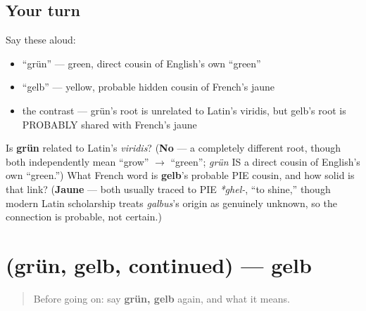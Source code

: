 \subsection*{Your turn}
Say these aloud:

\begin{itemize}
\raggedright
  \item \textquotedblleft{}grün\textquotedblright{} — green, direct cousin of English's own \textquotedblleft{}green\textquotedblright{}
  \item \textquotedblleft{}gelb\textquotedblright{} — yellow, probable hidden cousin of French's jaune
  \item the contrast — grün's root is unrelated to Latin's viridis, but gelb's root is PROBABLY shared with French's jaune
\end{itemize}

\begin{tcolorbox}[breakable,colback=teal!4,colframe=teal!35!black,title={Before you move on}]
Is \textbf{grün} related to Latin's \emph{viridis}? (\textbf{No} — a completely different root, though both independently mean \textquotedblleft{}grow\textquotedblright{} $\to$ \textquotedblleft{}green\textquotedblright{}; \emph{grün} IS a direct cousin of English's own \textquotedblleft{}green.\textquotedblright{}) What French word is \textbf{gelb}'s probable PIE cousin, and how solid is that link? (\textbf{Jaune} — both usually traced to PIE \emph{*ghel-}, \textquotedblleft{}to shine,\textquotedblright{} though modern Latin scholarship treats \emph{galbus}'s origin as genuinely unknown, so the connection is probable, not certain.)
\end{tcolorbox}
\section[(grün, gelb, continued)]{(grün, gelb, continued) — gelb}

\label{lesson:GE-C23-gruen-gelb-more}



\begin{quote}
Before going on: say \textbf{grün, gelb} again, and what it means.
\end{quote}

